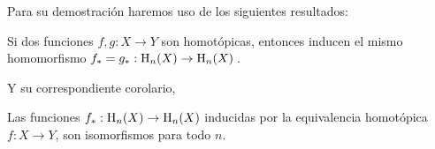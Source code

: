 Para su demostración haremos uso de los siguientes resultados:

\begin{theorem}
\begin{sloppypar}
Si dos funciones $f, g: X \to Y$ son homotópicas, entonces inducen el mismo homomorfismo  ${f_*=g_*:\text{\rm H}_n(X) \to \text{\rm H}_n(X)}\,$.
\end{sloppypar}
\end{theorem}
Y su correspondiente corolario,
\begin{corollary}\label{cor:homotopia}
Las funciones $f_*:\text{\rm H}_n(X) \to \text{\rm H}_n(X)$ inducidas por la equivalencia homotópica $f:X \to Y$, son isomorfismos para todo $n$.
\end{corollary}

